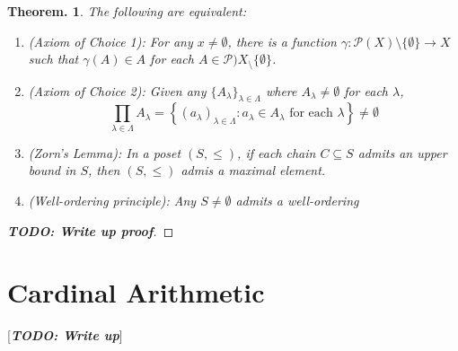 \documentclass[11pt, a4paper]{memoir}
\theoremstyle{change}
\newtheorem{theorem}{Theorem.}[section]
\theoremstyle{plain}
\theoremstyle{nonumberplain}
\newtheorem{proof}{Proof}
\newcommand{\TODO}[1]{[\textit{\textbf{TODO: #1}}]}
\numberwithin{equation}{section}
\begin{document}
\begin{theorem}
    The following are equivalent:
    \begin{enumerate}[nl,r]
        \item \textit{(Axiom of Choice 1)}: For any $x\neq\emptyset$, there is a function $\gamma:\mathcal{P}(X)\setminus\{\emptyset\}\to X$ such that $\gamma(A)\in A$ for each $A\in\mathcal{P})X_\setminus\{\emptyset\}$.
        \item \textit{(Axiom of Choice 2)}: Given any $\{A_\lambda\}_{\lambda\in\Lambda}$ where $A_\lambda\neq\emptyset$ for each $\lambda$,
            \begin{equation*}
                \prod_{\lambda\in\Lambda}A_\lambda = \left\{(a_\lambda)_{\lambda\in\Lambda}:a_\lambda\in A_\lambda\text{ for each }\lambda\right\}\neq \emptyset
            \end{equation*}
        \item \textit{(Zorn's Lemma)}: In a poset $(S,\leq)$, if each chain $C\subseteq S$ admits an upper bound in $S$, then $(S,\leq)$ admis a maximal element.
        \item \textit{(Well-ordering principle)}: Any $S\neq\emptyset$ admits a well-ordering
    \end{enumerate}
\end{theorem}
\begin{proof}
    \TODO{Write up proof}
\end{proof}
\section{Cardinal Arithmetic}
\TODO{Write up}
\end{document}
